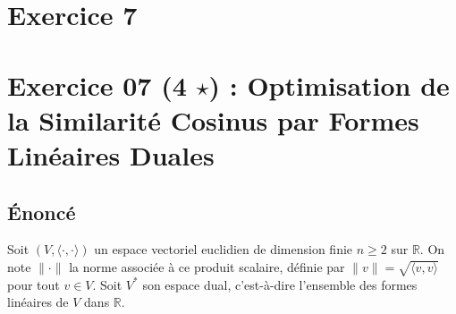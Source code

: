 \documentclass[11pt,a4paper]{report}
\begin{document}
\section*{Exercice 7}
\hypertarget{exercice-07-4-star-optimisation-de-la-similarituxe9-cosinus-par-formes-linuxe9aires-duales}{%
\section{\texorpdfstring{Exercice 07 (4 \(\star\)) : Optimisation de la
Similarité Cosinus par Formes Linéaires
Duales}{Exercice 07 (4 \textbackslash star) : Optimisation de la Similarité Cosinus par Formes Linéaires Duales}}\label{exercice-07-4-star-optimisation-de-la-similarituxe9-cosinus-par-formes-linuxe9aires-duales}}

\hypertarget{uxe9noncuxe9}{%
\subsection{Énoncé}\label{uxe9noncuxe9}}

Soit \((V, \langle \cdot, \cdot \rangle)\) un espace vectoriel euclidien
de dimension finie \(n \ge 2\) sur \(\mathbb{R}\). On note \(\|\cdot\|\)
la norme associée à ce produit scalaire, définie par
\(\|v\| = \sqrt{\langle v, v \rangle}\) pour tout \(v \in V\). Soit
\(V^*\) son espace dual, c'est-à-dire l'ensemble des formes linéaires de
\(V\) dans \(\mathbb{R}\).
\end{document}
